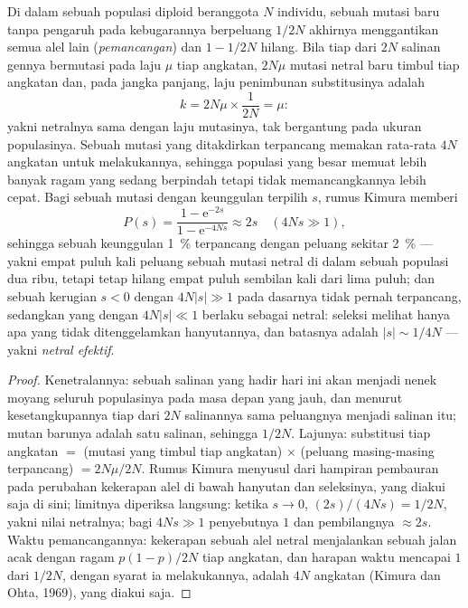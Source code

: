 \begin{theorem}\label{thm:b3:molecular-evolution:neutral}
%
Di dalam sebuah populasi diploid beranggota $N$ individu, sebuah mutasi baru tanpa
pengaruh pada kebugarannya berpeluang $1/2N$ akhirnya menggantikan semua
alel lain (\emph{pemancangan}) dan $1 - 1/2N$ hilang. Bila tiap
dari $2N$ salinan gennya bermutasi pada laju $\mu$ tiap angkatan, $2N\mu$
mutasi netral baru timbul tiap angkatan dan, pada jangka panjang,
laju penimbunan substitusinya adalah
\[
k = 2N\mu\times\frac{1}{2N} = \mu :
\]
yakni \emph{} netralnya sama dengan laju mutasinya,
tak bergantung pada ukuran populasinya. Sebuah mutasi yang ditakdirkan terpancang memakan
rata-rata $4N$ angkatan untuk melakukannya, sehingga populasi yang besar memuat lebih banyak
ragam yang sedang berpindah tetapi tidak memancangkannya lebih cepat. Bagi sebuah mutasi dengan
keunggulan terpilih $s$, rumus Kimura memberi 
\[
P(s) = \frac{1 - \mathrm{e}^{-2s}}{1 - \mathrm{e}^{-4Ns}} \approx 2s
\quad (4Ns \gg 1),
\]
sehingga sebuah keunggulan \qty{1}{\%} terpancang dengan peluang sekitar
\qty{2}{\%} --- yakni empat puluh kali peluang sebuah mutasi netral di dalam sebuah
populasi dua ribu, tetapi tetap hilang empat puluh sembilan kali dari lima puluh;
dan sebuah kerugian $s < 0$ dengan $4N|s| \gg 1$ pada dasarnya tidak pernah
terpancang, sedangkan yang dengan $4N|s| \ll 1$ berlaku sebagai netral: seleksi
melihat hanya apa yang tidak ditenggelamkan hanyutannya, dan batasnya adalah $|s| \sim
1/4N$ --- yakni \emph{netral efektif}.
\end{theorem}
\begin{proof}
Kenetralannya: sebuah salinan yang hadir hari ini akan menjadi nenek moyang seluruh
populasinya pada masa depan yang jauh, dan menurut kesetangkupannya tiap dari $2N$
salinannya sama peluangnya menjadi salinan itu; mutan barunya adalah satu salinan, sehingga
$1/2N$. Lajunya: substitusi tiap angkatan $=$ (mutasi yang timbul tiap
angkatan) $\times$ (peluang masing-masing terpancang) $= 2N\mu/2N$. Rumus
Kimura menyusul dari hampiran pembauran pada perubahan
kekerapan alel di bawah hanyutan dan seleksinya, yang diakui saja di sini; limitnya
diperiksa langsung: ketika $s \to 0$, $(2s)/(4Ns) = 1/2N$, yakni nilai
netralnya; bagi $4Ns \gg 1$ penyebutnya $1$ dan pembilangnya
$\approx 2s$. Waktu pemancangannya: kekerapan sebuah alel netral
menjalankan sebuah jalan acak dengan ragam $p(1-p)/2N$ tiap angkatan, dan
harapan waktu mencapai $1$ dari $1/2N$, dengan syarat ia melakukannya,
adalah $4N$ angkatan (Kimura dan Ohta, 1969), yang diakui saja.
\end{proof}

